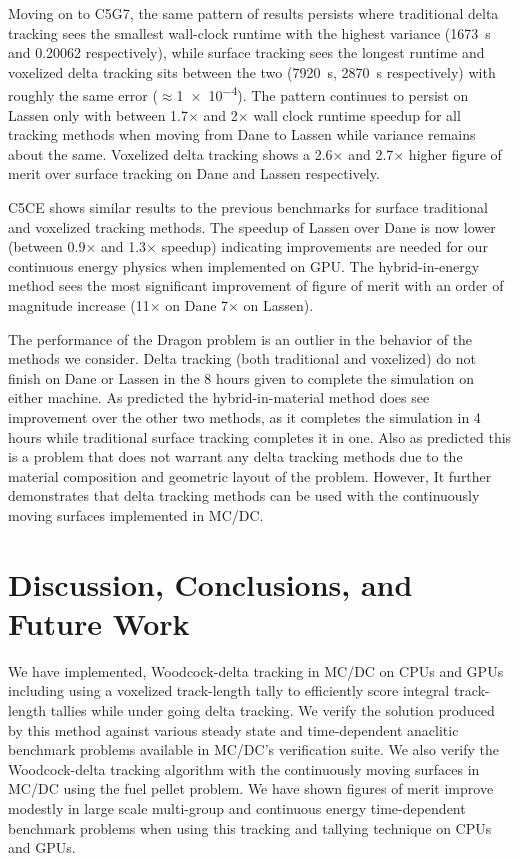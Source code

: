 Moving on to C5G7, the same pattern of results persists where traditional delta tracking sees the smallest wall-clock runtime with the highest variance (\SI{1673}{\s} and \num{0.20062} respectively), while surface tracking sees the longest runtime and voxelized delta tracking sits between the two (\SI{7920}{\s}, \SI{2870}{\s} respectively) with roughly the same error ($\approx$\num{1e-4}).
The pattern continues to persist on Lassen only with between \num{1.7}$\times$ and \num{2}$\times$ wall clock runtime speedup for all tracking methods when moving from Dane to Lassen while variance remains about the same.
Voxelized delta tracking shows a \num{2.6}$\times$ and \num{2.7}$\times$ higher figure of merit over surface tracking on Dane and Lassen respectively.

C5CE shows similar results to the previous benchmarks for surface traditional and voxelized tracking methods.
The speedup of Lassen over Dane is now lower (between \num{0.9}$\times$ and \num{1.3}$\times$ speedup) indicating improvements are needed for our continuous energy physics when implemented on GPU.
The hybrid-in-energy method sees the most significant improvement of figure of merit with an order of magnitude increase (\num{11}$\times$ on Dane \num{7}$\times$ on Lassen).


The performance of the Dragon problem is an outlier in the behavior of the methods we consider.
Delta tracking (both traditional and voxelized) do not finish on Dane or Lassen in the 8 hours given to complete the simulation on either machine.
As predicted the hybrid-in-material method does see improvement over the other two methods, as it completes the simulation in 4 hours while traditional surface tracking completes it in one.
Also as predicted this is a problem that does not warrant any delta tracking methods due to the material composition and geometric layout of the problem.
However, It further demonstrates that delta tracking methods can be used with the continuously moving surfaces implemented in MC/DC.


\section{Discussion, Conclusions, and Future Work}
\label{disucssions}

We have implemented, Woodcock-delta tracking in MC/DC on CPUs and GPUs including using a voxelized track-length tally to efficiently score integral track-length tallies while under going delta tracking.
We verify the solution produced by this method against various steady state and time-dependent anaclitic benchmark problems available in MC/DC's verification suite.
We also verify the Woodcock-delta tracking algorithm with the continuously moving surfaces in MC/DC using the fuel pellet problem.
We have shown figures of merit improve modestly in large scale multi-group and continuous energy time-dependent benchmark problems when using this tracking and tallying technique on CPUs and GPUs.

